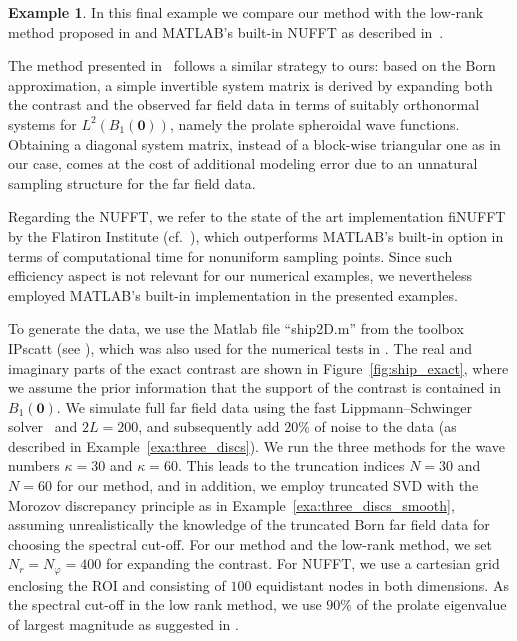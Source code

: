 \documentclass[11pt,a4paper]{article}
\theoremstyle{definition}
\newtheorem{example}[theorem]{Example}
\theoremstyle{remark} \newtheorem{remark}[theorem]{Remark}
\numberwithin{equation}{section}
\numberwithin{figure}{section}
\numberwithin{algorithm}{section}
\numberwithin{table}{section}
\newcommand{\bs}{\boldsymbol}
\newcommand{\bfzero}{{\bs 0}}
\begin{document}
\begin{example}
\label{ex:ship}
In this final example we compare our method with the low-rank method proposed in \cite{ZhoAudMenZha26} and MATLAB's built-in NUFFT as described in~\cite{DutRoh93}.

The method presented in~\cite{ZhoAudMenZha26} follows a similar strategy to ours:
based on the Born approximation, a simple invertible system matrix is derived by expanding both the contrast and the observed far field data in terms of suitably orthonormal systems for $L^2(B_1(\bfzero))$, namely the prolate spheroidal wave functions. Obtaining a diagonal system matrix, instead of a block-wise triangular one as in our case, comes at the cost of additional modeling error due to an 
unnatural sampling structure for the far field data.

Regarding the NUFFT, we refer to the state of the art implementation fiNUFFT by the Flatiron Institute (cf.~\cite{Bar21,BarMagKli19}), which outperforms MATLAB's built-in option in terms of computational time for nonuniform sampling points.
Since such efficiency aspect is not relevant for our numerical examples, we nevertheless employed MATLAB’s built-in implementation in the presented examples.

To generate the data, we use the Matlab file ``ship2D.m'' from the toolbox IPscatt (see \cite{BruKazLec19}), which was also used for the numerical tests in \cite[Fig.~12--14]{ZhoAudMenZha26}.
The real and imaginary parts of the exact contrast are shown in Figure~\ref{fig:ship_exact}, where we assume the prior information that the support of the contrast is contained in $B_1(\bfzero)$.
We simulate full far field data using the fast Lippmann--Schwinger solver~\cite{Vai97} and $2L=200$,
and subsequently add $20\%$ of noise to the data (as described in Example~\ref{exa:three_discs}).
We run the three methods for the wave numbers $\kappa=30$ and $\kappa=60$. This leads to the truncation indices $N=30$ and $N=60$ for our method, and in addition, we employ truncated SVD with the Morozov discrepancy principle as in Example~\ref{exa:three_discs_smooth}, assuming unrealistically the knowledge of the truncated Born far field data for choosing the spectral cut-off. 
For our method and the low-rank method, we set $N_r=N_\varphi=400$ for expanding the contrast.
For NUFFT, we use a cartesian grid enclosing the ROI and consisting of $100$ equidistant nodes in both dimensions.
As the spectral cut-off in the low rank method, we use $90\%$ of the prolate eigenvalue of largest magnitude as suggested in \cite{ZhoAudMenZha26}.



\end{example}
\end{document}
